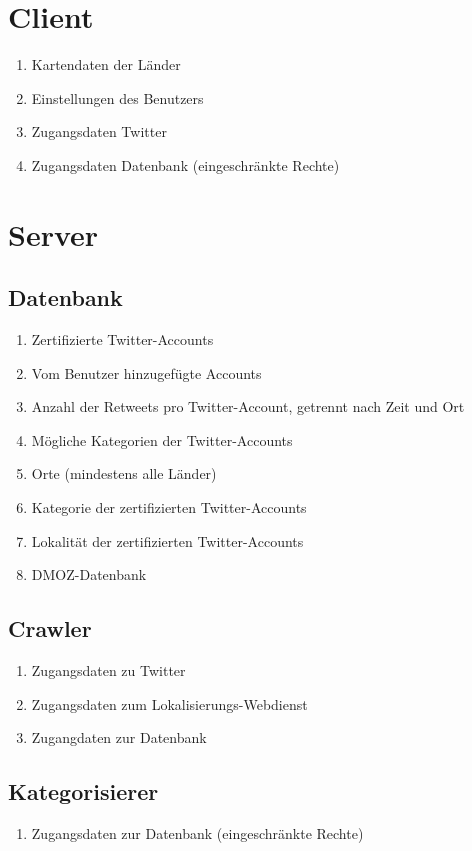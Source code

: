 \section{Client}
\begin{enumerate}[align=left,leftmargin=4em, label={\textbf{\textbackslash PD10\arabic*0\textbackslash}} ]
	\item Kartendaten der Länder 
	\item Einstellungen des Benutzers
	\item Zugangsdaten Twitter
	\item Zugangsdaten Datenbank (eingeschränkte Rechte)
\end{enumerate}	
	
\section{Server}
\subsection{Datenbank}
\begin{enumerate}[align=left,leftmargin=4em, label={\textbf{\textbackslash PD20\arabic*0\textbackslash}} ]
	\item Zertifizierte Twitter-Accounts	
	\item Vom Benutzer hinzugefügte Accounts
	\item Anzahl der Retweets pro Twitter-Account, getrennt nach Zeit und Ort
	\item Mögliche Kategorien der Twitter-Accounts
	\item Orte (mindestens alle Länder)
	\item Kategorie der zertifizierten Twitter-Accounts
	\item Lokalität der zertifizierten Twitter-Accounts
	\item DMOZ-Datenbank
\end{enumerate}



\subsection{Crawler}
\begin{enumerate}[align=left,leftmargin=4em, label={\textbf{\textbackslash PD30\arabic*0\textbackslash}} ]
	\item Zugangsdaten zu Twitter
	\item Zugangsdaten zum Lokalisierungs-Webdienst
	\item Zugangdaten zur Datenbank
\end{enumerate}%
\subsection{Kategorisierer}
\begin{enumerate}[align=left,leftmargin=4em, label={\textbf{\textbackslash PD40\arabic*0\textbackslash}} ]
	\item Zugangsdaten zur Datenbank (eingeschränkte Rechte)
\end{enumerate}